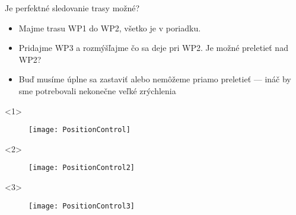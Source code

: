 \begin{frame}{Je perfektné sledovanie trasy možné?}
\begin{itemize}
\item<1-> Majme trasu WP1 do WP2, všetko je v poriadku.
\item<2-> Pridajme WP3 a rozmýšľajme čo sa deje pri WP2. Je možné preletieť nad WP2?
\item<3-> Buď musíme úplne sa zastaviť alebo nemôžeme priamo preletieť --- ináč by sme potrebovali nekonečne veľké zrýchlenia
\end{itemize}

\begin{onlyenv}<1>
  \begin{figure}
\centering
  \texttt{[image: PositionControl]}\\
\end{figure}
\end{onlyenv}

\begin{onlyenv}<2>
  \begin{figure}
\centering
  \texttt{[image: PositionControl2]}\\
\end{figure}
\end{onlyenv}

\begin{onlyenv}<3>
  \begin{figure}
\centering
  \texttt{[image: PositionControl3]}\\
\end{figure}
\end{onlyenv}
\end{frame}
